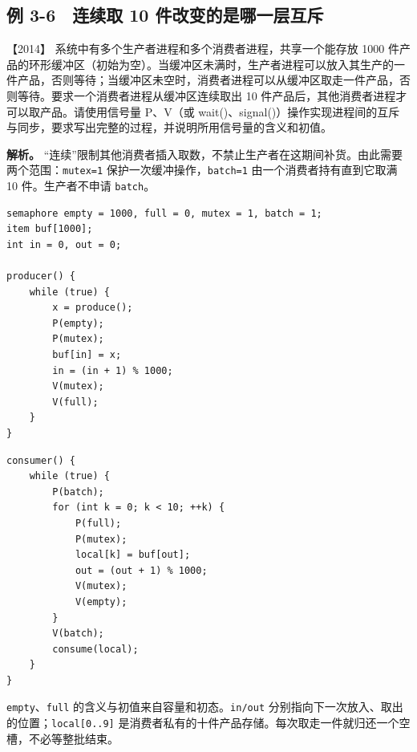 \subsection{例 3-6　连续取 10 件改变的是哪一层互斥}\label{ex-2014}

\noindent{}【2014】 系统中有多个生产者进程和多个消费者进程，共享一个能存放 1000 件产品的环形缓冲区（初始为空）。当缓冲区未满时，生产者进程可以放入其生产的一件产品，否则等待；当缓冲区未空时，消费者进程可以从缓冲区取走一件产品，否则等待。要求一个消费者进程从缓冲区连续取出 10 件产品后，其他消费者进程才可以取产品。请使用信号量 P、V（或 wait()、signal()）操作实现进程间的互斥与同步，要求写出完整的过程，并说明所用信号量的含义和初值。


\textbf{解析。} ``连续''限制其他消费者插入取数，不禁止生产者在这期间补货。由此需要两个范围：\texttt{mutex=1} 保护一次缓冲操作，\texttt{batch=1} 由一个消费者持有直到它取满 10 件。生产者不申请 \texttt{batch}。

\par\medskip\noindent
\begin{minipage}{\linewidth}
\begin{verbatim}
semaphore empty = 1000, full = 0, mutex = 1, batch = 1;
item buf[1000];
int in = 0, out = 0;

producer() {
    while (true) {
        x = produce();
        P(empty);
        P(mutex);
        buf[in] = x;
        in = (in + 1) % 1000;
        V(mutex);
        V(full);
    }
}
\end{verbatim}
\end{minipage}\par\medskip

\par\medskip\noindent
\begin{minipage}{\linewidth}
\begin{verbatim}
consumer() {
    while (true) {
        P(batch);
        for (int k = 0; k < 10; ++k) {
            P(full);
            P(mutex);
            local[k] = buf[out];
            out = (out + 1) % 1000;
            V(mutex);
            V(empty);
        }
        V(batch);
        consume(local);
    }
}
\end{verbatim}
\end{minipage}\par\medskip

\texttt{empty}、\texttt{full} 的含义与初值来自容量和初态。\texttt{in/out} 分别指向下一次放入、取出的位置；\texttt{local{[}0..9{]}} 是消费者私有的十件产品存储。每次取走一件就归还一个空槽，不必等整批结束。

